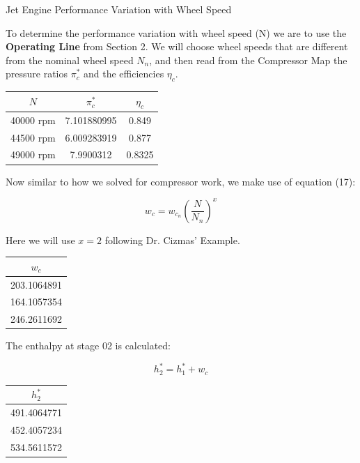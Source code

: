 \documentclass[titlepage]{article}
\begin{document}
\begin{section}{Jet Engine Performance Variation with Wheel Speed}

To determine the performance variation with wheel speed (N) we are to use the \textbf{Operating Line} from Section 2. We will choose wheel speeds that are different 
from the nominal wheel speed $N_{n}$, and then read from the Compressor Map the pressure ratios $\pi_{c}^{*}$ and the efficiencies $\eta_{c}$.

\begin{center}
  \begin{tabular}{|c|c|c|}
    \hline
    $N$ & $\pi_{c}^{*}$ & $\eta_{c}$ \\
    \hline
    40000 rpm & 7.101880995 & 0.849 \\
    \hline
    44500 rpm & 6.009283919 & 0.877 \\
    \hline
    49000 rpm & 7.9900312 & 0.8325 \\
    \hline
  \end{tabular}
\end{center}

Now similar to how we solved for compressor work, we make use of equation (17):

\begin{center}
  $$w_{c} = w_{c_{n}} \left( \frac{N}{N_{n}}\right)^{x}$$
\end{center}

Here we will use $x = 2$ following Dr. Cizmas' Example.

\begin{center}
  \begin{tabular}{|c|}
    \hline
    $w_{c}$ \\
    \hline
    203.1064891\\
    \hline
    164.1057354 \\
    \hline
    246.2611692 \\
    \hline
  \end{tabular}
\end{center}

The enthalpy at stage 02 is calculated:

\begin{equation}
  h_{2}^{*} = h_{1}^{*} + w_{c}
\end{equation}

\begin{center}
  \begin{tabular}{|c|}
    \hline
    $h_{2}^{*}$ \\
    \hline
    491.4064771 \\
    \hline
    452.4057234 \\
    \hline
    534.5611572 \\
    \hline
  \end{tabular}
\end{center}


\end{section}
\end{document}
